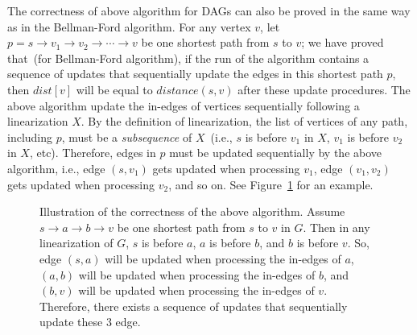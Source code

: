
\begin{algorithmblock}[0.8\textwidth]
	\xxx
	\xxx
	\xxx
	\xxx
	\xxx
	\xxx
	\xxx
\end{algorithmblock}


The correctness of above algorithm for DAGs can also be proved in the same way as in the Bellman-Ford algorithm.
For any vertex $v$, let $p = s \to v_1 \to v_2 \to \cdots \to v$ be one shortest path from $s$ to $v$;
we have proved that~(for Bellman-Ford algorithm), if the run of the algorithm contains a {sequence} of updates 
that sequentially update the edges in this shortest path $p$, then 
$dist[v]$ will be equal to $distance(s,v)$ after these update procedures.
The above algorithm update the in-edges of vertices sequentially following a linearization $X$.
By the definition of linearization, the list of vertices of any path, including $p$, must be a \emph{subsequence} of $X$~(i.e., $s$ is before
$v_1$ in $X$, $v_1$ is before $v_2$ in $X$, etc).
Therefore, edges in $p$ must be updated
sequentially by the above algorithm, i.e., edge $(s, v_1)$ gets updated when processing $v_1$,
edge $(v_1, v_2)$ gets updated when processing $v_2$, and so on. 
See Figure~\ref{fig:dag} for an example.

\begin{figure}[h]
\centering{}
\caption{Illustration of the correctness of the above algorithm.
Assume $s\to a \to b \to v$ be one shortest path from $s$ to $v$ in $G$.
Then in any linearization of $G$, $s$ is before $a$, $a$ is before $b$, and $b$ is before $v$.
So, edge $(s, a)$ will be updated when processing the in-edges of $a$, 
$(a, b)$ will be updated when processing the in-edges of $b$, 
and $(b, v)$ will be updated when processing the in-edges of $v$.
Therefore, there exists a sequence of updates that sequentially update these 3 edge.  }
\label{fig:dag}
\end{figure}
